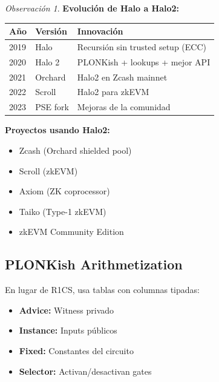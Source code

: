 \documentclass[11pt,a4paper,twoside,openright]{book}
\theoremstyle{definition}
\theoremstyle{plain}
\theoremstyle{remark}
\newtheorem{remark}{Observación}[chapter]
\begin{document}
\begin{remark}
\textbf{Evolución de Halo a Halo2:}

\begin{center}
\begin{tabular}{lll}
\toprule
\textbf{Año} & \textbf{Versión} & \textbf{Innovación} \\
\midrule
2019 & Halo & Recursión sin trusted setup (ECC) \\
2020 & Halo 2 & PLONKish + lookups + mejor API \\
2021 & Orchard & Halo2 en Zcash mainnet \\
2022 & Scroll & Halo2 para zkEVM \\
2023 & PSE fork & Mejoras de la comunidad \\
\bottomrule
\end{tabular}
\end{center}

\textbf{Proyectos usando Halo2:}
\begin{itemize}
    \item Zcash (Orchard shielded pool)
    \item Scroll (zkEVM)
    \item Axiom (ZK coprocessor)
    \item Taiko (Type-1 zkEVM)
    \item zkEVM Community Edition
\end{itemize}
\end{remark}

\subsection{PLONKish Arithmetization}

En lugar de R1CS, usa tablas con columnas tipadas:
\begin{itemize}
    \item \textbf{Advice:} Witness privado
    \item \textbf{Instance:} Inputs públicos
    \item \textbf{Fixed:} Constantes del circuito
    \item \textbf{Selector:} Activan/desactivan gates
\end{itemize}
\end{document}
